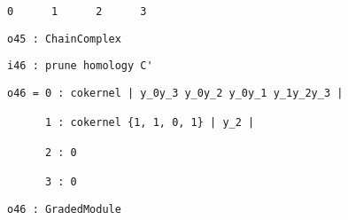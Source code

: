 \documentclass[12pt,leqno]{amsart}
\theoremstyle{definition}
\begin{document}
\begin{lstlisting}[xleftmargin=10pt, aboveskip=1.5pt, belowskip=1.5pt]
      0      1      2      3
\end{lstlisting}
\begin{lstlisting}[xleftmargin=10pt, aboveskip=1.5pt, belowskip=1.5pt] 
o45 : ChainComplex
\end{lstlisting}
\begin{lstlisting}[xleftmargin=10pt, aboveskip=1.5pt, belowskip=1.5pt] 
i46 : prune homology C'
\end{lstlisting}
\begin{lstlisting}[xleftmargin=10pt, lineskip=-10pt, aboveskip=1.5pt, belowskip=1.5pt]
o46 = 0 : cokernel | y_0y_3 y_0y_2 y_0y_1 y_1y_2y_3 |

      1 : cokernel {1, 1, 0, 1} | y_2 |              

      2 : 0                                          

      3 : 0   
\end{lstlisting}
\begin{lstlisting}[xleftmargin=10pt, aboveskip=1.5pt, belowskip=3.0pt]
o46 : GradedModule
\end{lstlisting}
\vfill
\newpage
\end{document}
